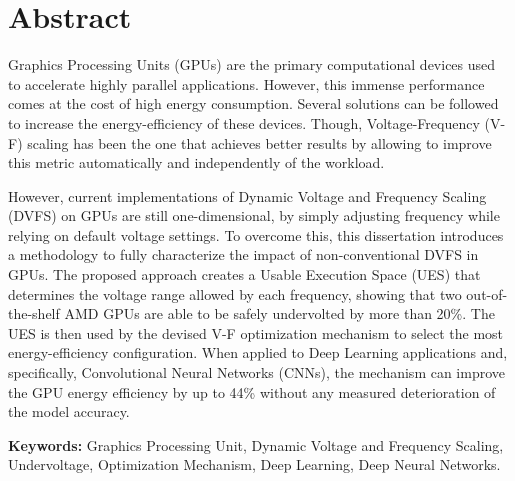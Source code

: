 
\section*{Abstract}


Graphics Processing Units (GPUs) are the primary computational devices used to accelerate highly parallel applications. However, this immense performance comes at the cost of high energy consumption. Several solutions can be followed to increase the energy-efficiency of these devices. Though, Voltage-Frequency (V-F) scaling has been the one that achieves better results by allowing to improve this metric automatically and independently of the workload. 

However, current implementations of Dynamic Voltage and Frequency Scaling (DVFS) on GPUs are still one-dimensional, by simply adjusting frequency while relying on default voltage settings. To overcome this, this dissertation introduces a methodology to fully characterize the impact of non-conventional DVFS in GPUs. The proposed approach creates a Usable Execution Space (UES) that determines the voltage range allowed by each frequency, showing that two out-of-the-shelf AMD GPUs are able to be safely undervolted by more than 20\%. The UES is then used by the devised V-F optimization mechanism to select the most energy-efficiency configuration. When applied to Deep Learning applications and, specifically, Convolutional Neural Networks (CNNs), the mechanism can improve the GPU energy efficiency by up to 44\% without any measured deterioration of the model accuracy.

\vfill

\textbf{\Large Keywords:} Graphics Processing Unit, Dynamic Voltage and Frequency Scaling, Undervoltage, Optimization Mechanism, Deep Learning, Deep Neural Networks.

